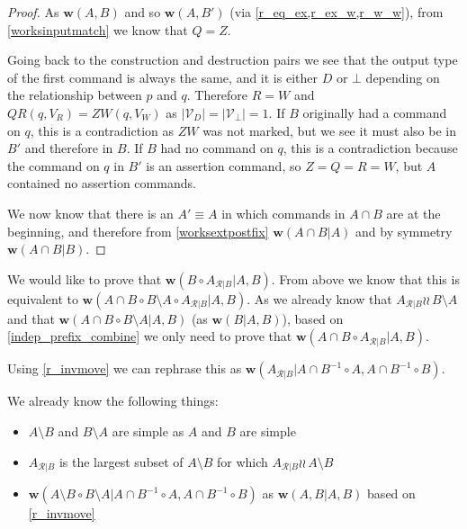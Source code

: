 \documentclass[12pt]{article}
\newcommand{\setvx}[1]{\mathcal{V}_{#1}}
\newcommand{\setd}{\setvx{D}}
\newcommand{\setb}{\setvx{\empt}}
\newcommand{\empt}{\bot}
\newcommand{\fscommand}[2]{{#1#2}}
\newcommand{\czw}{\fscommand{Z}{W}}
\newcommand{\cqr}{\fscommand{Q}{R}}
\newcommand{\cc}{\circ}
\newcommand{\indep}{\wr\!\!\wr\,} %
\newcommand{\works}[1]{{\mathbf{w}}({#1})}
\newcommand{\worksc}[2]{{\mathbf{w}}({#1}|{#2})}
\newcommand{\ordered}[1]{#1}
\newcommand{\recchar}[3]{{#1}^{#3}_{\mathcal{R}|{#2}}}
\newcommand{\reca}{\recchar{A}{B}{}} %
\theoremstyle{definition}
\begin{document}
\begin{proof}
As $\works{A,B}$ and so $\works{A,B'}$ (via \cref{r_eq_ex,r_ex_w,r_w_w}), 
from \cref{worksinputmatch}
we know that $Q=Z$. 

Going back to the construction and destruction pairs we see that the output type of the first command
is always the same, and it is either $D$ or $\empt$ depending on the relationship between $p$ and $q$.
Therefore $R=W$ and $\cqr(q, V_R)=\czw(q, V_W)$
as $|\setd|=|\setb|=1$. 
If $B$ originally had a command on $q$,
this is a contradiction as $\czw$ was not marked, but we see it must also be in $B'$ and therefore in $B$.
If $B$ had no command on $q$,
this is a contradiction because the command on $q$ in $B'$ is an assertion command, so $Z=Q=R=W$, 
but $A$ contained no assertion commands.

\medskip

We now know that there is an $A'\equiv A$ in which commands in $A\cap B$
are at the beginning, and therefore 
from \cref{worksextpostfix}
$\worksc{\ordered{A\cap B}}{A}$ and by symmetry $\worksc{\ordered{A\cap B}}{B}$.
\end{proof}

\medskip

We would like to prove that $\worksc{B\cc \reca}{A,B}$.
From above we know that this is equivalent to
$\worksc{\ordered{A\cap B}\cc \ordered{B\setminus A}\cc \reca}{A,B}$.
As we already know that $\reca\indep B\setminus A$
and that $\worksc{\ordered{A\cap B}\cc \ordered{B\setminus A}}{A,B}$
(as $\worksc{B}{A,B}$),
based on \cref{indep_prefix_combine}
we only need to prove that
$\worksc{\ordered{A\cap B}\cc \reca}{A,B}$.

\newcommand{\acbi}{\ordered{A\cap B}^{-1}}
\newcommand{\amb}{A\setminus B}
\newcommand{\bma}{B\setminus A}
Using \cref{r_invmove} we can rephrase this as
$\worksc{\reca}{\acbi\cc A,\acbi\cc B}$.

We already know the following things:
\begin{itemize}
\item $\amb$ and $\bma$ are simple as $A$ and $B$ are simple
\item $\reca$ is the largest subset of $\amb$ for which $\reca\indep\amb$
\item $\worksc{\ordered{\amb}\cc \ordered{\bma}}{\acbi\cc A,\acbi\cc B}$ as $\worksc{A,B}{A,B}$ based on \cref{r_invmove}
\end{itemize}
\end{document}
